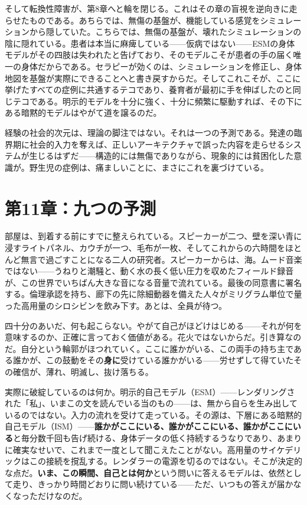 \documentclass[11pt, twoside, openright]{book}
\begin{document}
そして転換性障害が、第8章へと輪を閉じる。これはその章の盲視を逆向きに走らせたものである。あちらでは、無傷の基盤が、機能している感覚をシミュレーションから隠していた。こちらでは、無傷の基盤が、壊れたシミュレーションの陰に隠れている。患者は本当に麻痺している------仮病ではない------ESMの身体モデルがその四肢は失われたと告げており、そのモデルこそが患者の手の届く唯一の身体だからである。セラピーが効くのは、シミュレーションを修正し、身体地図を基盤が実際にできることへと書き戻すからだ。そしてこれこそが、ここに挙げたすべての症例に共通するテコであり、養育者が最初に手を伸ばしたのと同じテコである。明示的モデルを十分に強く、十分に頻繁に駆動すれば、その下にある暗黙的モデルはやがて道を譲るのだ。

経験の社会的次元は、理論の脚注ではない。それは一つの予測である。発達の臨界期に社会的入力を奪えば、正しいアーキテクチャで誤った内容を走らせるシステムが生じるはずだ------構造的には無傷でありながら、現象的には貧困化した意識が。野生児の症例は、痛ましいことに、まさにこれを裏づけている。


\chapter*{第11章：九つの予測}

部屋は、到着する前にすでに整えられている。スピーカーが二つ、壁を深い青に浸すライトパネル、カウチが一つ、毛布が一枚、そしてこれからの六時間をほとんど無言で過ごすことになる二人の研究者。スピーカーからは、海。ムード音楽ではない------うねりと潮騒と、動く水の長く低い圧力を収めたフィールド録音が、この世界でいちばん大きな音になる音量で流れている。最後の同意書に署名する。倫理承認を持ち、廊下の先に除細動器を備えた人々がミリグラム単位で量った高用量のシロシビンを飲み下す。あとは、全員が待つ。

四十分のあいだ、何も起こらない。やがて自己がほどけはじめる------それが何を意味するのか、正確に言っておく価値がある。花火ではないからだ。引き算なのだ。自分という輪郭がほつれていく。ここに誰かがいる、この両手の持ち主である誰かが、この鼓動をその\textbf{身に}受けている誰かがいる------労せずして得ていたその確信が、薄れ、明滅し、抜け落ちる。

実際に破綻しているのは何か。明示的自己モデル（ESM）------レンダリングされた「私」、いまこの文を読んでいる当のもの------は、無から自らを生み出しているのではない。入力の流れを受けて走っている。その源は、下層にある暗黙的自己モデル（ISM）------\textbf{誰かがここにいる、誰かがここにいる、誰かがここにいる}と毎分数千回も告げ続ける、身体データの低く持続するうなりであり、あまりに確実なせいで、これまで一度として聞こえたことがない。高用量のサイケデリックはこの接続を撹乱する。レンダラーの電源を切るのではない。そこが決定的な点だ。\textbf{いま、この瞬間、自己とは何か}という問いに答えるモデルは、依然として走り、きっかり時間どおりに問い続けている------ただ、いつもの答えが届かなくなっただけなのだ。
\end{document}
